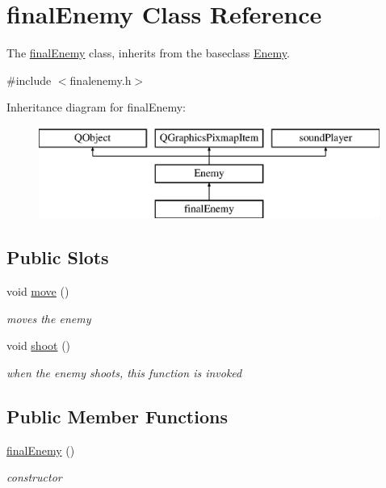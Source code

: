 \hypertarget{classfinalEnemy}{}\section{final\+Enemy Class Reference}
\label{classfinalEnemy}


The \hyperlink{classfinalEnemy}{final\+Enemy} class, inherits from the baseclass \hyperlink{classEnemy}{Enemy}.  




{\ttfamily \#include $<$finalenemy.\+h$>$}

Inheritance diagram for final\+Enemy\+:\begin{figure}[H]
\begin{center}
\leavevmode
\includegraphics[height=3.000000cm]{classfinalEnemy}
\end{center}
\end{figure}
\subsection*{Public Slots}
\begin{DoxyCompactItemize}
\item 
\mbox{\label{classfinalEnemy_a9422198ed38d374edff347744cae7f9d}} 
void \hyperlink{classfinalEnemy_a9422198ed38d374edff347744cae7f9d}{move} ()
\begin{DoxyCompactList}\small\item\em moves the enemy \end{DoxyCompactList}\item 
\mbox{\label{classfinalEnemy_a525be5392591999ed81d67145a68374c}} 
void \hyperlink{classfinalEnemy_a525be5392591999ed81d67145a68374c}{shoot} ()
\begin{DoxyCompactList}\small\item\em when the enemy shoots, this function is invoked \end{DoxyCompactList}\end{DoxyCompactItemize}
\subsection*{Public Member Functions}
\begin{DoxyCompactItemize}
\item 
\mbox{\label{classfinalEnemy_ad8c93e80b7f2ca279a777bed6d209401}} 
\hyperlink{classfinalEnemy_ad8c93e80b7f2ca279a777bed6d209401}{final\+Enemy} ()
\begin{DoxyCompactList}\small\item\em constructor \end{DoxyCompactList}\end{DoxyCompactItemize}


